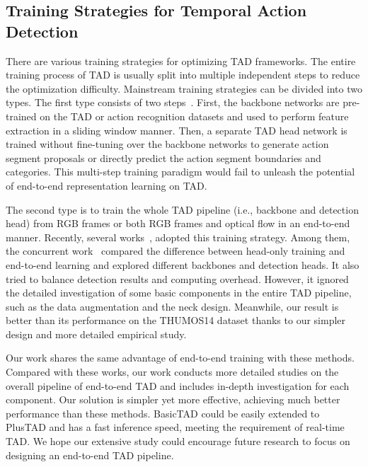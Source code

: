 \documentclass[a4paper,fleqn]{cas-dc}
\begin{document}
\subsection{Training Strategies for Temporal Action Detection}
There are various training strategies for optimizing TAD frameworks. The entire training process of TAD is usually split into multiple independent steps to reduce the optimization difficulty.
Mainstream training strategies can be divided into two types. 
The first type consists of two steps~\citep{bsn,bmn,bsn++,rapnet, TADTR,rtd}. 
First, the backbone networks are pre-trained on the TAD or action recognition datasets and used to perform feature extraction in a sliding window manner. 
Then, a separate TAD head network is trained without fine-tuning over the backbone networks to generate action segment proposals or directly predict the action segment boundaries and categories.
This multi-step training paradigm would fail to unleash the potential of end-to-end representation learning on TAD.

The second type is to train the whole TAD pipeline (i.e., backbone and detection head) from RGB frames or both RGB frames and optical flow in an end-to-end manner.
Recently, several works~\citep{ssad,sparse-rcnn-tad,afsd,rgb_enough,e2e-TADTR}, adopted this training strategy. Among them, the concurrent work~\citep{e2e-TADTR} compared the difference between head-only training and end-to-end learning and explored different backbones and detection heads. It also tried to balance detection results and computing overhead. However, it ignored the detailed investigation of some basic components in the entire TAD pipeline, such as the data augmentation and the neck design. Meanwhile, our result is better than its performance on the THUMOS14 dataset thanks to our simpler design and more detailed empirical study.

Our work shares the same advantage of end-to-end training with these methods. Compared with these works, our work conducts more detailed studies on the overall pipeline of end-to-end TAD and includes in-depth investigation for each component. Our solution is simpler yet more effective, achieving much better performance than these methods. BasicTAD could be easily extended to PlusTAD and has a fast inference speed, meeting the requirement of real-time TAD. We hope our extensive study could encourage future research to focus on designing an end-to-end TAD pipeline.
\end{document}
